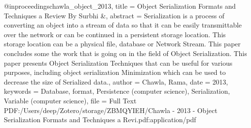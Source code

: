 @inproceedings{chawla_object_2013,
	title = {Object Serialization Formats and Techniques a Review By Surbhi \&},
	abstract = {Serialization is a process of converting an object into a stream of data so that it can be easily transmittable over the network or can be continued in a persistent storage location. This storage location can be a physical file, database or Network Stream. This paper concludes some the work that is going on in the field of Object Serialization. This paper presents Object Serialization Techniques that can be useful for various purposes, including object serialization Minimization which can be used to decrease the size of Serialized data.},
	author = {Chawla, Rama},
	date = {2013},
	keywords = {Database, format, Persistence (computer science), Serialization, Variable (computer science)},
	file = {Full Text PDF:/Users/deep/Zotero/storage/ZBMQYIEH/Chawla - 2013 - Object Serialization Formats and Techniques a Revi.pdf:application/pdf}
}